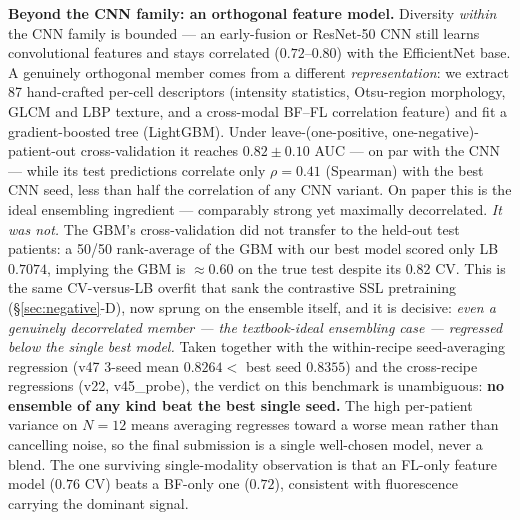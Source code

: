 \documentclass[conference]{IEEEtran}
\begin{document}
\textbf{Beyond the CNN family: an orthogonal feature model.} Diversity \emph{within} the CNN family is bounded --- an early-fusion or ResNet-50 CNN still learns convolutional features and stays correlated ($0.72$--$0.80$) with the EfficientNet base. A genuinely orthogonal member comes from a different \emph{representation}: we extract 87 hand-crafted per-cell descriptors (intensity statistics, Otsu-region morphology, GLCM and LBP texture, and a cross-modal BF--FL correlation feature) and fit a gradient-boosted tree (LightGBM). Under leave-(one-positive, one-negative)-patient-out cross-validation it reaches $0.82 \pm 0.10$ AUC --- on par with the CNN --- while its test predictions correlate only $\rho = 0.41$ (Spearman) with the best CNN seed, less than half the correlation of any CNN variant. On paper this is the ideal ensembling ingredient --- comparably strong yet maximally decorrelated. \emph{It was not.} The GBM's cross-validation did not transfer to the held-out test patients: a 50/50 rank-average of the GBM with our best model scored only LB $0.7074$, implying the GBM is $\approx$$0.60$ on the true test despite its $0.82$ CV. This is the same CV-versus-LB overfit that sank the contrastive SSL pretraining (\S\ref{sec:negative}-D), now sprung on the ensemble itself, and it is decisive: \emph{even a genuinely decorrelated member --- the textbook-ideal ensembling case --- regressed below the single best model.} Taken together with the within-recipe seed-averaging regression (v47 3-seed mean $0.8264 <$ best seed $0.8355$) and the cross-recipe regressions (v22, v45\_probe), the verdict on this benchmark is unambiguous: \textbf{no ensemble of any kind beat the best single seed.} The high per-patient variance on $N=12$ means averaging regresses toward a worse mean rather than cancelling noise, so the final submission is a single well-chosen model, never a blend. The one surviving single-modality observation is that an FL-only feature model ($0.76$ CV) beats a BF-only one ($0.72$), consistent with fluorescence carrying the dominant signal.
\end{document}
